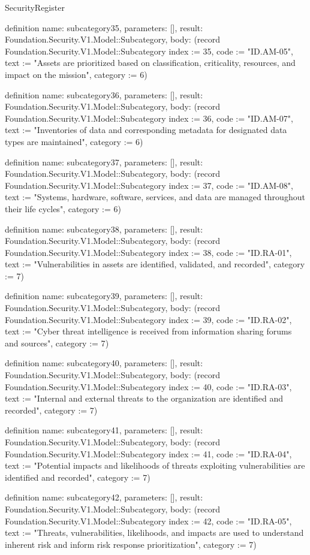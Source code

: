 \begin{lexlean}{SecurityRegister}
\begin{semanticmodule}
definition{
  name: subcategory35,
  parameters: [],
  result: Foundation.Security.V1.Model::Subcategory,
  body: (record Foundation.Security.V1.Model::Subcategory {index := 35, code := "ID.AM-05", text := "Assets are prioritized based on classification, criticality, resources, and impact on the mission", category := 6})
}

definition{
  name: subcategory36,
  parameters: [],
  result: Foundation.Security.V1.Model::Subcategory,
  body: (record Foundation.Security.V1.Model::Subcategory {index := 36, code := "ID.AM-07", text := "Inventories of data and corresponding metadata for designated data types are maintained", category := 6})
}

definition{
  name: subcategory37,
  parameters: [],
  result: Foundation.Security.V1.Model::Subcategory,
  body: (record Foundation.Security.V1.Model::Subcategory {index := 37, code := "ID.AM-08", text := "Systems, hardware, software, services, and data are managed throughout their life cycles", category := 6})
}

definition{
  name: subcategory38,
  parameters: [],
  result: Foundation.Security.V1.Model::Subcategory,
  body: (record Foundation.Security.V1.Model::Subcategory {index := 38, code := "ID.RA-01", text := "Vulnerabilities in assets are identified, validated, and recorded", category := 7})
}

definition{
  name: subcategory39,
  parameters: [],
  result: Foundation.Security.V1.Model::Subcategory,
  body: (record Foundation.Security.V1.Model::Subcategory {index := 39, code := "ID.RA-02", text := "Cyber threat intelligence is received from information sharing forums and sources", category := 7})
}

definition{
  name: subcategory40,
  parameters: [],
  result: Foundation.Security.V1.Model::Subcategory,
  body: (record Foundation.Security.V1.Model::Subcategory {index := 40, code := "ID.RA-03", text := "Internal and external threats to the organization are identified and recorded", category := 7})
}

definition{
  name: subcategory41,
  parameters: [],
  result: Foundation.Security.V1.Model::Subcategory,
  body: (record Foundation.Security.V1.Model::Subcategory {index := 41, code := "ID.RA-04", text := "Potential impacts and likelihoods of threats exploiting vulnerabilities are identified and recorded", category := 7})
}

definition{
  name: subcategory42,
  parameters: [],
  result: Foundation.Security.V1.Model::Subcategory,
  body: (record Foundation.Security.V1.Model::Subcategory {index := 42, code := "ID.RA-05", text := "Threats, vulnerabilities, likelihoods, and impacts are used to understand inherent risk and inform risk response prioritization", category := 7})
}


\end{semanticmodule}
\end{lexlean}
